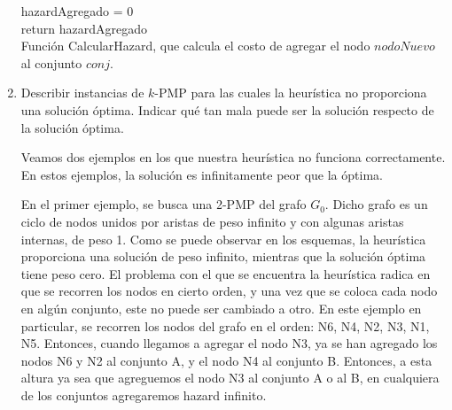 \documentclass[11pt, a4paper, twoside]{article}
\begin{document}
\begin{enumerate}
		\begin{algorithm}[H]
		  hazardAgregado = 0 \\
		  return hazardAgregado \\
		\caption {Función CalcularHazard, que calcula el costo de agregar el nodo $nodoNuevo$ al conjunto $conj$.}
		\end{algorithm}
		
		
		\item Describir instancias de $k$-PMP para las cuales la heurística no proporciona una solución
		óptima. Indicar qué tan mala puede ser la solución respecto de la solución óptima.
		
		Veamos dos ejemplos en los que nuestra heurística no funciona correctamente. En estos ejemplos,
		la solución es infinitamente peor que la óptima.
		
		En el primer ejemplo, se busca una 2-PMP del grafo $G_{0}$. Dicho grafo es un ciclo de nodos unidos por aristas 
		de peso infinito y con algunas aristas internas, de peso 1. Como se puede observar en los esquemas,
		la heurística proporciona una solución de peso infinito, mientras que la solución óptima tiene peso cero.
		El problema con el que se encuentra la heurística radica en que se recorren los nodos en cierto orden, y
		una vez que se coloca cada nodo en algún conjunto, este no puede ser cambiado a otro. En este 
		ejemplo en particular, se recorren los nodos del grafo en el orden: N6, N4, N2, N3, N1, N5. Entonces,
		cuando llegamos a agregar el nodo N3, ya se han agregado los nodos N6 y N2 al conjunto A, y el nodo
		N4 al conjunto B. Entonces, a esta altura ya sea que  agreguemos el nodo N3 al conjunto A o al B, en 
		cualquiera de los conjuntos agregaremos hazard infinito.
		

\end{enumerate}
\end{document}
